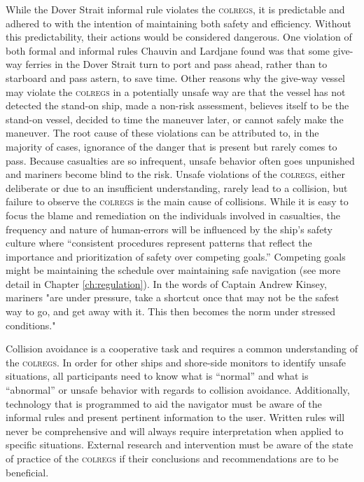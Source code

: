 \documentclass[twoside,symmetric,notoc]{tufte-book}
\begin{document}
\par{%
While the Dover Strait informal rule violates the \textsc{colregs}, it is predictable and adhered to with the intention of maintaining both safety and efficiency. Without this predictability, their actions would be considered dangerous. One violation of both formal and informal rules Chauvin and Lardjane found was that some give-way ferries in the Dover Strait turn to port and pass ahead, rather than to starboard and pass astern, to save time. Other reasons why the give-way vessel may violate the \textsc{colregs} in a potentially unsafe way are that the vessel has not detected the stand-on ship, made a non-risk assessment, believes itself to be the stand-on vessel, decided to time the maneuver later, or cannot safely make the maneuver. The root cause of these violations can be attributed to, in the majority of cases, ignorance of the danger that is present but rarely comes to pass. Because casualties are so infrequent, unsafe behavior often goes unpunished and mariners become blind to the risk.\cite{Wagenaar} Unsafe violations of the \textsc{colregs}, either deliberate or due to an insufficient understanding, rarely lead to a collision, but failure to observe the \textsc{colregs} is the main cause of collisions. While it is easy to focus the blame and remediation on the individuals involved in casualties, the frequency and nature of human-errors will be influenced by the ship's safety culture where ``consistent procedures represent patterns that reflect the importance and prioritization of safety over competing goals.''\cite{Hetherington} Competing goals might be maintaining the schedule over maintaining safe navigation (see more detail in Chapter \ref{ch:regulation}). In the words of Captain Andrew Kinsey, mariners "are under pressure, take a shortcut once that may not be the safest way to go, and get away with it. This then becomes the norm under stressed conditions."\cite{Allianz_2018} 
}
\par{%
Collision avoidance is a cooperative task and requires a common understanding of the \textsc{colregs}. In order for other ships and shore-side monitors to identify unsafe situations, all participants need to know what is ``normal'' and what is ``abnormal'' or unsafe behavior with regards to collision avoidance. Additionally, technology that is programmed to aid the navigator must be aware of the informal rules and present pertinent information to the user. Written rules will never be comprehensive and will always require interpretation when applied to specific situations. External research and intervention must be aware of the state of practice of the \textsc{colregs} if their conclusions and recommendations are to be beneficial.
}
\end{document}
